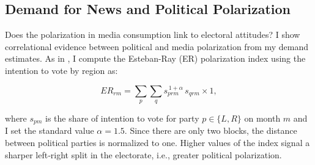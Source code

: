 \documentclass[12pt]{article}
\begin{document}

	\subsection{Demand for News and Political Polarization}
	
	
	

Does the polarization in media consumption link to electoral attitudes?  I show correlational evidence between political and media polarization from my demand estimates. As in \cite{martin2017}, I compute  the Esteban-Ray (ER) polarization index \citep{esteban} using the intention to vote by region as:

\begin{equation}
	ER_{rm}  =	 \sum_{p}   \sum_{q}
	s_{prm}^{\,1+\alpha}\,s_{qrm} \times 1,
		\label{eq:er}
\end{equation}

where $s_{pm}$ is the share of intention to vote for party $p\in \{L,R\}$  on month $m$ and I set the standard value $\alpha=1.5$. Since there are only two blocks, the distance between political parties is normalized to one.  Higher values of the index signal a sharper left‑right split in the electorate, i.e., greater political polarization.
\end{document}
